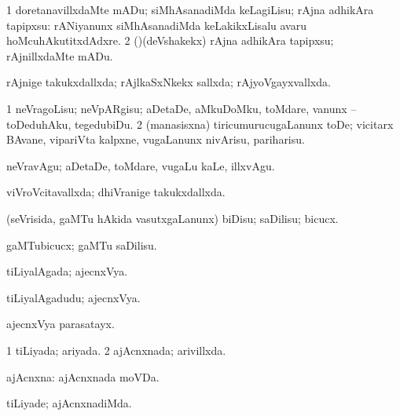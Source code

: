 {{\bentry
{} 
\gl{\sakirx}
\expl{}
\bmng
\bnum
\num{1} doretanavillxdaMte mADu; siMhAsanadiMda keLagiLisu; rAjna adhikAra tapipxsu:  rANiyanunx siMhAsanadiMda keLakikxLisalu avaru hoMcuhAkutitxdAdxre. 
\num{2} (\pArxparx)(deVshakekx) rAjna adhikAra tapipxsu; rAjnillxdaMte mADu. 
\enum
\emng
\eentry

\bentry
{} 
\gl{\gu}
\expl{}
\bmng
rAjnige takukxdallxda; rAjlkaSxNkekx sallxda; rAjyoVgayxvallxda. 
\emng
\eentry

\bentry
{} 
\gl{\sakirx}
\expl{}
\bmng
\bnum
\num{1} neVragoLisu; neVpARgisu; aDetaDe, aMkuDoMku, toMdare, \mo vanunx -- toDeduhAku, tegedubiDu. 
\num{2} (manasisxna) tiricumurucugaLanunx toDe; vicitarx BAvane, vipariVta kalpxne, \mo vugaLanunx nivArisu, pariharisu. 
\enum
\emng

\noindent
\gl{\akirx}
\expl{}
\bmng
neVravAgu; aDetaDe, toMdare, \mo vugaLu kaLe, illxvAgu. 
\emng
\eentry

\bentry
{} 
\gl{\gu}
\expl{}
\bmng
viVroVcitavallxda; dhiVranige takukxdallxda. 
\emng
\eentry

\bentry
{} 
\gl{\akirx}
\bmng
(seVrisida, gaMTu hAkida vasutxgaLanunx) biDisu; saDilisu; bicucx. 
\emng
\eentry

\bentry
{} 
\gl{\akirx}
\bmng
gaMTubicucx; gaMTu saDilisu. 
\emng
\eentry

\bentry
{} 
\gl{\gu}
\expl{}
\bmng
tiLiyalAgada; ajecnxVya. 
\emng
\eentry

\bentry
{} 
\gl{\nA}
\expl{}
\bmng
tiLiyalAgadudu; ajecnxVya. 
\emng

\noindent
\gl{\pagu}
\expl{}
\bmng
{} ajecnxVya parasatayx. 
\emng
\eentry

\bentry
{} 
\gl{\gu}
\expl{}
\bmng
\bnum
\num{1} tiLiyada; ariyada. 
\num{2} ajAcnxnada; arivillxda. 
\enum
\emng
\eentry

\bentry
{} 
\gl{\nA}
\expl{}
\bmng
ajAcnxna:  ajAcnxnada moVDa. 
\emng
\eentry

\bentry
{} 
\gl{\kirxvi}
\expl{}
\bmng
tiLiyade; ajAcnxnadiMda. 
\emng
\eentry

}}
